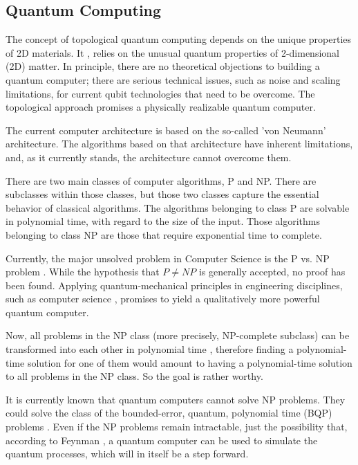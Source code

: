 \subsection*{Quantum Computing}
The concept of topological quantum computing \cite{Tqc1} depends on the unique properties of 2D materials. 
It \cite{Tqc1,Tqc2,Tqc3, Tqc4, Tqc5}, relies on the unusual quantum properties of 2-dimensional (2D) matter.
In principle, there are no theoretical objections to building a quantum computer; there are serious technical issues, such as noise and scaling limitations, for current qubit technologies that need to be overcome\cite{QCProblems}. 
The topological approach promises a physically realizable quantum computer\cite{Tqc2,Tqc3}. 

The current computer architecture is based on the so-called 'von Neumann' architecture. The algorithms based on that architecture have inherent limitations, and, as it currently stands, the architecture cannot overcome them.

There are two main classes of computer algorithms, P and NP. There are subclasses within those classes, but those two classes capture the essential behavior of classical algorithms. The algorithms belonging to class P are solvable in polynomial time, with regard to the size of the input. Those algorithms belonging to class NP are those that require exponential time to complete\cite{PvsNP}.

Currently, the major unsolved problem in Computer Science is the P vs. NP problem \cite{PvsNP}. While the hypothesis that $ P \neq NP $ is generally accepted, no proof has been found. Applying quantum-mechanical principles in engineering disciplines, such as computer science \cite{FQC}, promises to yield a qualitatively more powerful quantum computer. 

 Now, all problems in the NP class (more precisely, NP-complete subclass) can be transformed into each other in polynomial time \cite{NPComplete},  therefore finding a polynomial-time solution for one of them would amount to having a polynomial-time solution to all problems in the NP class. So the goal is rather worthy. 

It is currently known that quantum computers cannot solve NP problems. They could solve the class of the bounded-error, quantum, polynomial time (BQP) problems \cite{BQP}. 
Even if the NP problems remain intractable, just the possibility that, according to Feynman \cite{FQC}, a quantum computer can be used to simulate the quantum processes, which will in itself be a step forward. 

